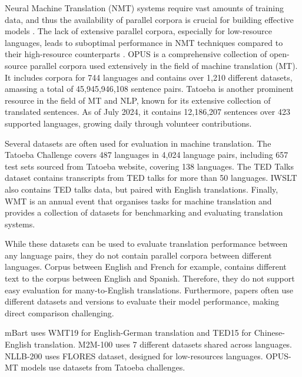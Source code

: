 \documentclass[a4paper]{article}
\begin{document}
Neural Machine Translation (NMT) systems require vast amounts of training data, and thus the availability of parallel corpora is crucial for building effective models \cite{koehn-2017-challenges}. The lack of extensive parallel corpora, especially for low-resource languages, leads to suboptimal performance in NMT techniques compared to their high-resource counterparts \cite{ranathunga-2023-nmt-low-res}. OPUS \cite{opus} is a comprehensive collection of open-source parallel corpora used extensively in the field of machine translation (MT). It includes corpora for 744 languages and contains over 1,210 different datasets, amassing a total of 45,945,946,108 sentence pairs. Tatoeba \cite{tatoeba} is another prominent resource in the field of MT and NLP, known for its extensive collection of translated sentences. As of July 2024, it contains 12,186,207 sentences over 423 supported languages, growing daily through volunteer contributions.

Several datasets are often used for evaluation in machine translation. The Tatoeba Challenge \cite{tiedemann-2020-tatoeba-challenge} covers 487 languages in 4,024 language pairs, including 657 test sets sourced from Tatoeba website, covering 138 languages. The TED Talks dataset \cite{ye-2018-word-embeddings-ted} contains transcripts from TED talks for more than 50 languages. IWSLT \cite{agarwal-iwstl-2023} also contains TED talks data, but paired with English translations. Finally, WMT \cite{barrault-2020-wmt} is an annual event that organises tasks for machine translation and provides a collection of datasets for benchmarking and evaluating translation systems.

While these datasets can be used to evaluate translation performance between any language pairs, they do not contain parallel corpora between different languages. Corpus between English and French for example, contains different text to the corpus between English and Spanish. Therefore, they do not support easy evaluation for many-to-English translations. Furthermore, papers often use different datasets and versions to evaluate their model performance, making direct comparison challenging.

mBart \cite{liu-2020-mbart} uses WMT19 for English-German translation and TED15 for Chinese-English translation. M2M-100 \cite{fan-2020-m2m100} uses 7 different datasets shared across languages. NLLB-200  \cite{nllb200-2020} uses FLORES dataset, designed for low-resources languages. OPUS-MT \cite{tiedemann-2023-democratizing,tiedemann-2020-opus-mt} models use datasets from Tatoeba challenges.
\end{document}
